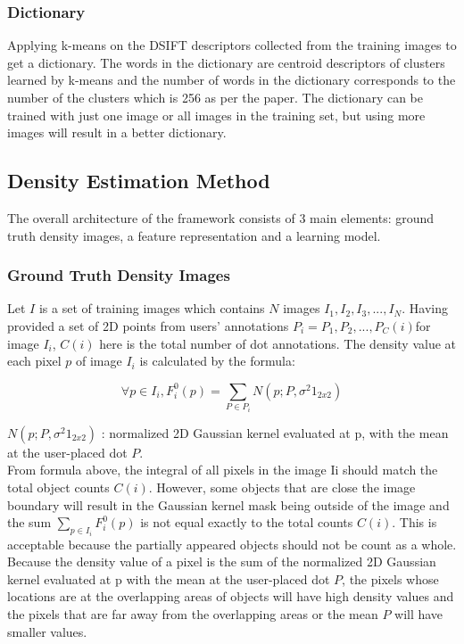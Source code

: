 \subsubsection{Dictionary}
Applying k-means on the DSIFT descriptors collected from the training images to get a dictionary. The words in the dictionary are centroid descriptors of clusters learned by k-means and the number of words in the dictionary corresponds to the number of the clusters which is 256 as per the paper. The dictionary can be trained with just one image or all images in the training set, but using more images will result in a better dictionary.
\subsection{Density Estimation Method}
The overall architecture of the framework consists of 3 main elements: ground truth density images, a feature representation and a learning model.
\subsubsection{Ground Truth Density Images}

Let $I$ is a set of training images which contains $N$ images $I_1, I_2, I_3,...,I_N.$  Having provided a set of 2D points from users’ annotations $P_i={P_1, P_2,..., P_C(i)}$for image $I_i$,  $C(i)$ here is the total number of dot annotations. The density value at each pixel $p$ of image $I_i$ is calculated by the formula:

\begin{displaymath}
    \forall p \in I_i, F^0_i(p) = \sum_{P \in P_i} N(p; P, \sigma^2 1_{2x2})
\end{displaymath}

$N(p; P, \sigma^2 1_{2x2})$ : normalized 2D Gaussian kernel evaluated at p, with the mean at the user-placed dot $P$.\\
From formula above, the integral of all pixels in the image Ii should match the total object counts $C(i)$. However, some objects that are close the image boundary will result in the Gaussian kernel mask being outside of the image and the sum $\sum_{p \in I_i} F^0_i(p)$ is not equal exactly to the total counts $C(i)$. This is acceptable because the partially appeared objects should not be count as a whole.\\
Because the density value of a pixel is the sum of the normalized 2D Gaussian kernel evaluated at p with the mean at the user-placed dot $P$, the pixels whose locations are at the overlapping areas of objects will have high density values and the pixels that are far away from the overlapping areas or the mean $P$ will have smaller values.


